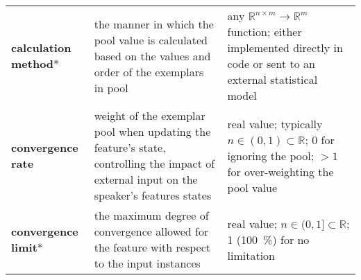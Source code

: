 {\begin{landscape}
\begin{table}[t]
\begin{tabulary}{\linewidth}{lLL}
				{\color{RoyalBlue}\textbf{calculation method}}*
				& the manner in which the pool value is calculated based on the values and order of the exemplars in pool
				& any $\mathbb{R}^{n \times m} \longrightarrow \mathbb{R}^{m}$ function; either implemented directly in code or sent to an external statistical model\\\addlinespace[0.2cm]
				
				{\color{RoyalBlue}\textbf{convergence rate}}
				& weight of the exemplar pool when updating the feature's state, controlling the impact of external input on the speaker's features states
				& real value; typically $n \in (0, 1) \subset \mathbb{R}$; 0 for ignoring the pool; $> 1$ for over-weighting the pool value\\\addlinespace[0.2cm]
				
				{\color{red}\textbf{convergence limit}}*
				& the maximum degree of convergence allowed for the feature with respect to the input instances
				& real value; $n \in (0, 1] \subset \mathbb{R}$; 1 (\SI{100}{\percent}) for no limitation \\
				\bottomrule
			\end{tabulary}
		\end{table}
	\end{landscape}
}

